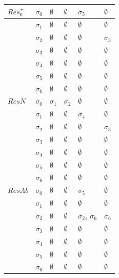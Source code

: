 \documentclass[11pt,a4paper]{article}
\begin{document}
\begin{table}[]
\begin{tabular}{|l|l|l|l|l|l|}
$Res_0^+$ & $\sigma_0$ &  $\emptyset$ & $\emptyset$ & $\sigma_5$ & $\emptyset$   \\ \hline
     & $\sigma_1$ &  $\emptyset$  & $\emptyset$ & $\emptyset$   &  $\emptyset$  \\ \hline
     & $\sigma_2$ &  $\emptyset$  & $\emptyset$ & $\emptyset$   &  $\sigma_3$  \\ \hline
     & $\sigma_3$ &  $\emptyset$  & $\emptyset$ & $\emptyset$   &  $\emptyset$  \\ \hline
     & $\sigma_4$ &  $\emptyset$  & $\emptyset$ & $\emptyset$   &  $\emptyset$  \\ \hline
     & $\sigma_5$ &  $\emptyset$  & $\emptyset$ & $\emptyset$   &  $\emptyset$  \\ \hline
     & $\sigma_6$ &  $\emptyset$  & $\emptyset$ & $\emptyset$   &  $\emptyset$  \\ \hline
$ResN$ & $\sigma_0$ &  $\sigma_1$ & $\sigma_2$ & $\emptyset$ & $\emptyset$   \\ \hline
     & $\sigma_1$ &  $\emptyset$  & $\emptyset$ & $\sigma_4$   &  $\emptyset$  \\ \hline
     & $\sigma_2$ &  $\emptyset$  & $\emptyset$ & $\emptyset$   &  $\sigma_3$  \\ \hline
     & $\sigma_3$ &  $\emptyset$  & $\emptyset$ & $\emptyset$   &  $\emptyset$  \\ \hline
     & $\sigma_4$ &  $\emptyset$  & $\emptyset$ & $\emptyset$   &  $\emptyset$  \\ \hline
     & $\sigma_5$ &  $\emptyset$  & $\emptyset$ & $\emptyset$   &  $\emptyset$  \\ \hline
     & $\sigma_6$ &  $\emptyset$  & $\emptyset$ & $\emptyset$   &  $\emptyset$  \\ \hline
 $ResAb$ & $\sigma_0$ &  $\emptyset$ & $\emptyset$ & $\sigma_5$ & $\emptyset$   \\ \hline
     & $\sigma_1$ &  $\emptyset$  & $\emptyset$ & $\emptyset$   &  $\emptyset$  \\ \hline
     & $\sigma_2$ &  $\emptyset$  & $\emptyset$ & $\sigma_2,~\sigma_6$   &  $\sigma_6$  \\ \hline
     & $\sigma_3$ &  $\emptyset$  & $\emptyset$ & $\emptyset$   &  $\emptyset$  \\ \hline
     & $\sigma_4$ &  $\emptyset$  & $\emptyset$ & $\emptyset$   &  $\emptyset$  \\ \hline
     & $\sigma_5$ &  $\emptyset$  & $\emptyset$ & $\emptyset$   &  $\emptyset$  \\ \hline
     & $\sigma_6$ &  $\emptyset$  & $\emptyset$ & $\emptyset$   &  $\emptyset$  \\ \hline          
\end{tabular}
\end{table}
\end{document}
